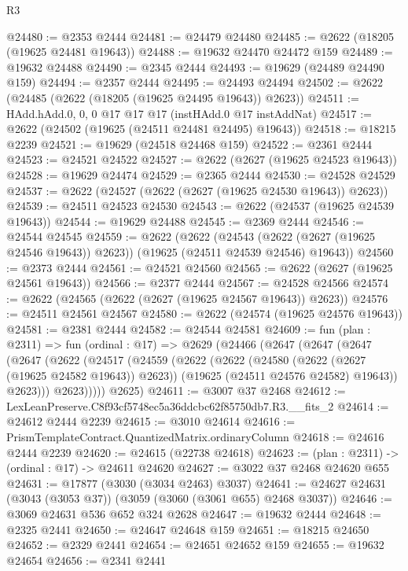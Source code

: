\begin{lexlean}{R3}
\begin{coremodule}
@24480 := @2353 @2444
@24481 := @24479 @24480
@24485 := @2622 (@18205 (@19625 @24481 @19643))
@24488 := @19632 @24470 @24472 @159
@24489 := @19632 @24488
@24490 := @2345 @2444
@24493 := @19629 (@24489 @24490 @159)
@24494 := @2357 @2444
@24495 := @24493 @24494
@24502 := @2622 (@24485 (@2622 (@18205 (@19625 @24495 @19643)) @2623))
@24511 := HAdd.hAdd.{0, 0, 0} @17 @17 @17 (instHAdd.{0} @17 instAddNat)
@24517 := @2622 (@24502 (@19625 (@24511 @24481 @24495) @19643))
@24518 := @18215 @2239
@24521 := @19629 (@24518 @24468 @159)
@24522 := @2361 @2444
@24523 := @24521 @24522
@24527 := @2622 (@2627 (@19625 @24523 @19643))
@24528 := @19629 @24474
@24529 := @2365 @2444
@24530 := @24528 @24529
@24537 := @2622 (@24527 (@2622 (@2627 (@19625 @24530 @19643)) @2623))
@24539 := @24511 @24523 @24530
@24543 := @2622 (@24537 (@19625 @24539 @19643))
@24544 := @19629 @24488
@24545 := @2369 @2444
@24546 := @24544 @24545
@24559 := @2622
    (@2622
      (@24543 (@2622 (@2627 (@19625 @24546 @19643)) @2623))
      (@19625 (@24511 @24539 @24546) @19643))
@24560 := @2373 @2444
@24561 := @24521 @24560
@24565 := @2622 (@2627 (@19625 @24561 @19643))
@24566 := @2377 @2444
@24567 := @24528 @24566
@24574 := @2622 (@24565 (@2622 (@2627 (@19625 @24567 @19643)) @2623))
@24576 := @24511 @24561 @24567
@24580 := @2622 (@24574 (@19625 @24576 @19643))
@24581 := @2381 @2444
@24582 := @24544 @24581
@24609 := fun (plan : @2311) =>
  fun (ordinal : @17) =>
  @2629
    (@24466
      (@2647
        (@2647
          (@2647
            (@2647
              (@2622
                (@24517
                  (@24559
                    (@2622
                      (@2622
                        (@24580 (@2622 (@2627 (@19625 @24582 @19643)) @2623))
                        (@19625 (@24511 @24576 @24582) @19643))
                      @2623)))
                @2623)))))
      @2625)
@24611 := @3007 @37 @2468
@24612 := LexLeanPreserve.C8f93cf5748ec5a36ddcbc62f85750db7.R3.__fits_2
@24614 := @24612 @2444 @2239
@24615 := @3010 @24614
@24616 := PrismTemplateContract.QuantizedMatrix.ordinaryColumn
@24618 := @24616 @2444 @2239
@24620 := @24615 (@22738 @24618)
@24623 := (plan : @2311) -> (ordinal : @17) -> @24611 @24620
@24627 := @3022 @37 @2468 @24620 @655
@24631 := @17877 (@3030 (@3034 @2463) @3037)
@24641 := @24627 @24631 (@3043 (@3053 @37)) (@3059 (@3060 (@3061 @655) @2468 @3037))
@24646 := @3069 @24631 @536 @652 @324 @2628
@24647 := @19632 @2444
@24648 := @2325 @2441
@24650 := @24647 @24648 @159
@24651 := @18215 @24650
@24652 := @2329 @2441
@24654 := @24651 @24652 @159
@24655 := @19632 @24654
@24656 := @2341 @2441

\end{coremodule}
\end{lexlean}
